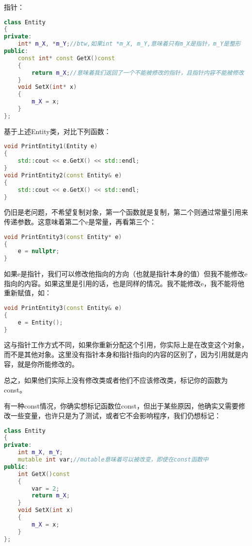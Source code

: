 指针：

\begin{lstlisting}[language=c++]
class Entity
{
private:
    int* m_X, *m_Y;//btw,如果int *m_X, m_Y,意味着只有m_X是指针，m_Y是整形
public:
    const int* const GetX()const
    {
        return m_X;//意味着我们返回了一个不能被修改的指针，且指针内容不能被修改
    }
    void SetX(int* x)
    {
        m_X = x;
    }
};
\end{lstlisting}


基于上述{\ncodestyle Entity}类，对比下列函数：

\begin{lstlisting}[language=c++]
void PrintEntity1(Entity e)
{
    std::cout << e.GetX() << std::endl;
}
void PrintEntity2(const Entity& e)
{
    std::cout << e.GetX() << std::endl;
}
\end{lstlisting}

仍旧是老问题，不希望复制对象，第一个函数就是复制，第二个则通过常量引用来传递参数。这意味着第二个{\ncodestyle e}是常量，再看第三个：

\begin{lstlisting}[language=c++]
void PrintEntity3(const Entity* e)
{
    e = nullptr;
}
\end{lstlisting}

如果{\ncodestyle e}是指针，我们可以修改他指向的方向（也就是指针本身的值）但我不能修改{\ncodestyle e}指向的内容。如果这里是引用的话，也是同样的情况。我不能修改{\ncodestyle e}，我不能将他重新赋值，如：

\begin{lstlisting}[language=c++]
void PrintEntity3(const Entity& e)
{
    e = Entity();
}
\end{lstlisting}

这与指针工作方式不同，如果你重新分配这个引用，你实际上是在改变这个对象，而不是其他对象。这里没有指针本身和指针指向的内容的区别了，因为引用就是内容，就是你所能修改的。

总之，如果他们实际上没有修改类或者他们不应该修改类，标记你的函数为{\ncodestyle const}。

有一种{\ncodestyle const}情况，你确实想标记函数位{\ncodestyle const}，但出于某些原因，他确实又需要修改一些变量，也许只是为了测试，或者它不会影响程序，我们仍想标记：

\begin{lstlisting}[language=c++]
class Entity
{
private:
    int m_X, m_Y;
    mutable int var;//mutable意味着可以被改变，即使在const函数中
public:
    int GetX()const
    {
        var = 2;
        return m_X;
    }
    void SetX(int x)
    {
        m_X = x;
    }
};
\end{lstlisting}


